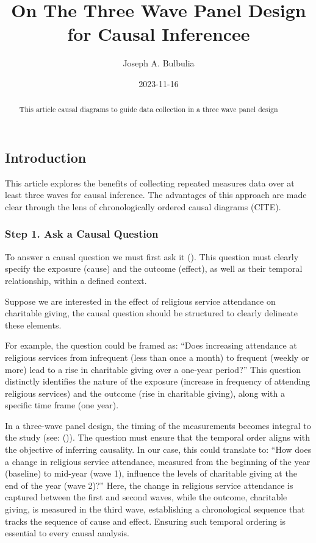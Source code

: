 \documentclass[
  singlecolumn,
  9pt]{article}
\title{On The Three Wave Panel Design for Causal Inferencee}
\author{Joseph A. Bulbulia}
\affil{%
                  Victoria University of Wellington, New Zealand, School
                  of Psychology, Centre for Applied Cross-Cultural
                  Research
              }
\date{2023-11-16}
\begin{document}
\maketitle
\begin{abstract}
This article causal diagrams to guide data collection in a three wave
panel design
\end{abstract}
\subsection{Introduction}\label{introduction}

This article explores the benefits of collecting repeated measures data
over at least three waves for causal inference. The advantages of this
approach are made clear through the lens of chronologically ordered
causal diagrams (CITE).

\subsubsection{Step 1. Ask a Causal
Question}\label{step-1.-ask-a-causal-question}

To answer a causal question we must first ask it
(). This question
must clearly specify the exposure (cause) and the outcome (effect), as
well as their temporal relationship, within a defined context.

Suppose we are interested in the effect of religious service attendance
on charitable giving, the causal question should be structured to
clearly delineate these elements.

For example, the question could be framed as: ``Does increasing
attendance at religious services from infrequent (less than once a
month) to frequent (weekly or more) lead to a rise in charitable giving
over a one-year period?'' This question distinctly identifies the nature
of the exposure (increase in frequency of attending religious services)
and the outcome (rise in charitable giving), along with a specific time
frame (one year).

In a three-wave panel design, the timing of the measurements becomes
integral to the study (see: ()). The question must ensure that the temporal order
aligns with the objective of inferring causality. In our case, this
could translate to: ``How does a change in religious service attendance,
measured from the beginning of the year (baseline) to mid-year (wave 1),
influence the levels of charitable giving at the end of the year (wave
2)?'' Here, the change in religious service attendance is captured
between the first and second waves, while the outcome, charitable
giving, is measured in the third wave, establishing a chronological
sequence that tracks the sequence of cause and effect. Ensuring such
temporal ordering is essential to every causal analysis.
\end{document}
